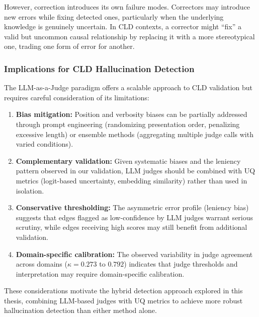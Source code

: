 However, correction introduces its own failure modes. Correctors may introduce new errors while fixing detected ones, particularly when the underlying knowledge is genuinely uncertain. In CLD contexts, a corrector might ``fix'' a valid but uncommon causal relationship by replacing it with a more stereotypical one, trading one form of error for another.

\subsubsection{Implications for CLD Hallucination Detection}

The LLM-as-a-Judge paradigm offers a scalable approach to CLD validation but requires careful consideration of its limitations:

\begin{enumerate}
    \item \textbf{Bias mitigation:} Position and verbosity biases can be partially addressed through prompt engineering (randomizing presentation order, penalizing excessive length) or ensemble methods (aggregating multiple judge calls with varied conditions).
    
    \item \textbf{Complementary validation:} Given systematic biases and the leniency pattern observed in our validation, LLM judges should be combined with UQ metrics (logit-based uncertainty, embedding similarity) rather than used in isolation.
    
    \item \textbf{Conservative thresholding:} The asymmetric error profile (leniency bias) suggests that edges flagged as low-confidence by LLM judges warrant serious scrutiny, while edges receiving high scores may still benefit from additional validation.
    
    \item \textbf{Domain-specific calibration:} The observed variability in judge agreement across domains ($\kappa = 0.273$ to $0.792$) indicates that judge thresholds and interpretation may require domain-specific calibration.
\end{enumerate}

These considerations motivate the hybrid detection approach explored in this thesis, combining LLM-based judges with UQ metrics to achieve more robust hallucination detection than either method alone.






